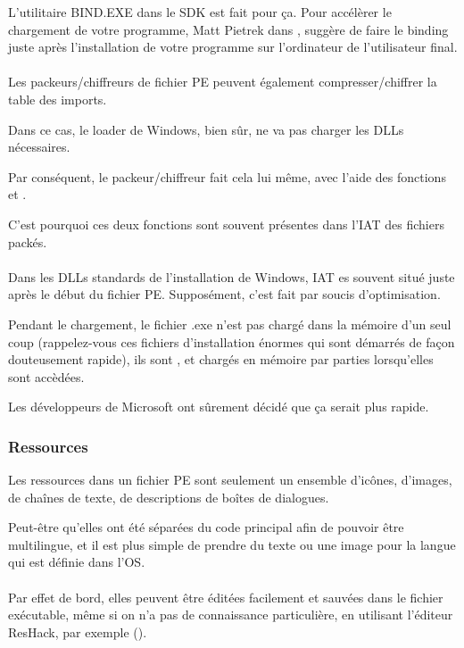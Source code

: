 L'utilitaire BIND.EXE dans le SDK est fait pour ça.
Pour accélèrer le chargement de votre programme, Matt Pietrek dans \PietrekPEURL,
suggère de faire le binding juste après l'installation de votre programme sur l'ordinateur
de l'utilisateur final. \\
\\
Les packeurs/chiffreurs de fichier PE peuvent également compresser/chiffrer la table
des imports.

Dans ce cas, le loader de Windows, bien sûr, ne va pas charger les DLLs nécessaires.

Par conséquent, le packeur/chiffreur fait cela lui même, avec l'aide des fonctions
 et .

C'est pourquoi ces deux fonctions sont souvent présentes dans l'\ac{IAT} des fichiers
packés.\\
\\
Dans les DLLs standards de l'installation de Windows, \ac{IAT} es souvent situé juste
après le début du fichier PE.
Supposément, c'est fait par soucis d'optimisation.

Pendant le chargement, le fichier .exe n'est pas chargé dans la mémoire d'un seul
coup (rappelez-vous ces fichiers d'installation énormes qui sont démarrés de façon
douteusement rapide), ils sont , et chargés en mémoire par parties lorsqu'elles
sont accèdées.

Les développeurs de Microsoft ont sûrement décidé que ça serait plus rapide.

\subsubsection{Ressources}

\label{PEresources}

Les ressources dans un fichier PE sont seulement un ensemble d'icônes, d'images,
de chaînes de texte, de descriptions de boîtes de dialogues.

Peut-être qu'elles ont été séparées du code principal afin de pouvoir être multilingue,
et il est plus simple de prendre du texte ou une image pour la langue qui est définie
dans l'\ac{OS}. \\
\\
Par effet de bord, elles peuvent être éditées facilement et sauvées dans le fichier
exécutable, même si on n'a pas de connaissance particulière, en utilisant l'éditeur
ResHack, par exemple ().

